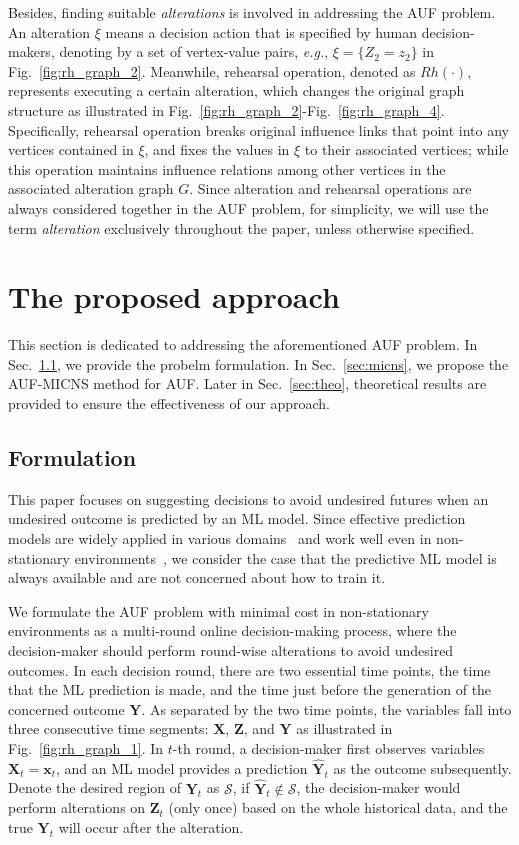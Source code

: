 \documentclass{article}
\theoremstyle{plain}
\theoremstyle{definition}
\theoremstyle{remark}
\def \eg {\textit{e.g.}}
\def \Fig {Fig.}
\def \Sec {Sec.}
\def \x {\mathbf{x}}
\def \Z {\mathbf{Z}}
\def \sS {\mathcal{S}}
\def \X {\mathbf{X}}
\def \Y {\mathbf{Y}}
\begin{document}
Besides, finding suitable \textit{alterations} is involved in addressing the AUF problem.
An alteration $\xi$ means a decision action that is specified by human decision-makers, denoting by a set of vertex-value pairs, \eg, $\xi=\{Z_2=z_2\}$ in \Fig~\ref{fig:rh_graph_2}. 
Meanwhile, rehearsal operation, denoted as $Rh(\cdot)$, represents executing a certain alteration, 
which changes the original graph structure as illustrated in \Fig~\ref{fig:rh_graph_2}-\Fig~\ref{fig:rh_graph_4}. 
Specifically, rehearsal operation breaks original influence links that point into any vertices contained in $\xi$, and fixes the values in $\xi$ to their associated vertices;
while this operation maintains influence relations among other vertices in the associated alteration graph $G$. 
Since alteration and rehearsal operations are always considered together in the AUF problem, for simplicity, we will use the term \emph{alteration} exclusively throughout the paper, unless otherwise specified.



\section{The proposed approach}
\label{sec:approach}
This section is dedicated to addressing the aforementioned AUF problem. 
In \Sec~\ref{sec:CoM}, we provide the probelm formulation. 
In \Sec~\ref{sec:micns}, we propose the AUF-MICNS method for AUF. 
Later in \Sec~\ref{sec:theo}, theoretical results are provided to ensure the effectiveness of our approach. 


\subsection{Formulation}
\label{sec:CoM}
This paper focuses on suggesting decisions to avoid undesired futures when an undesired outcome is predicted by an ML model. 
Since effective prediction models are widely applied in various domains~\citep{lecun2015deep} and work well even in non-stationary environments~\citep{zhou2022open}, we consider the case that the predictive ML model is always available and are not concerned about how to train it. 

We formulate the AUF problem with minimal cost in non-stationary environments as a multi-round online decision-making process, 
where the decision-maker should perform round-wise alterations to avoid undesired outcomes. 
In each decision round, there are two essential time points, the time that the ML prediction is made, and the time just before the generation of the concerned outcome $\Y$. 
As separated by the two time points, the variables fall into three consecutive time segments: $\X$, $\Z$, and $\Y$ as illustrated in \Fig~\ref{fig:rh_graph_1}.
In $t$-th round, a decision-maker first observes variables $\X_t=\x_t$, and an ML model provides a prediction $\hat{\Y}_t$ as the outcome subsequently. 
Denote the desired region of $\Y_t$ as $\sS$, if $\hat{\Y}_t\not\in\sS$, 
the decision-maker would perform alterations on $\Z_t$ (only once) based on the whole historical data, 
and the true $\Y_t$ will occur after the alteration. 
\end{document}
